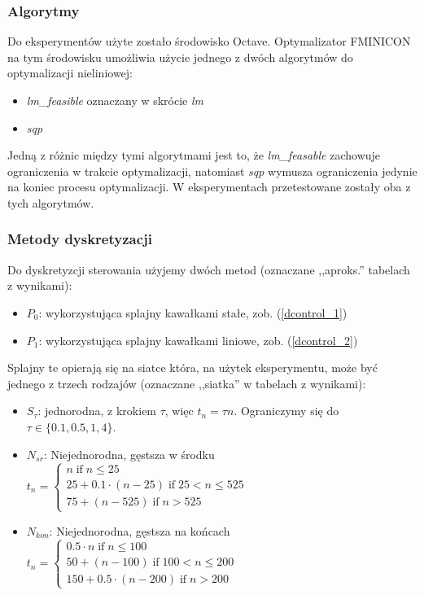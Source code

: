 \documentclass[11pt]{article}
\def\iif{\operatorname{if}}
\begin{document}
\subsubsection{Algorytmy}
Do eksperymentów użyte zostało środowisko Octave. Optymalizator FMINICON na tym środowisku umożliwia użycie jednego z dwóch algorytmów do optymalizacji nieliniowej:
\begin{itemize}
\item{\it lm\_feasible\/} oznaczany w skrócie {\it lm\/}
\item{\it sqp\/}
\end{itemize}
Jedną z różnic między tymi algorytmami jest to, że {\it lm\_feasable\/} zachowuje ograniczenia w trakcie optymalizacji, natomiast {\it sqp\/} wymusza ograniczenia jedynie na koniec procesu optymalizacji. W eksperymentach przetestowane zostały oba z tych algorytmów.
\subsubsection{Metody dyskretyzacji}
Do dyskretyzcji sterowania użyjemy dwóch metod (oznaczane ,,aproks.'' tabelach z wynikami):
\begin{itemize}
\item{$P_0$:} wykorzystująca splajny kawałkami stałe, zob. (\ref{dcontrol_1})
\item{$P_1$:} wykorzystująca splajny kawałkami liniowe, zob. (\ref{dcontrol_2})
\end{itemize}
Splajny te opierają się na siatce która, na użytek eksperymentu, może być jednego z trzech rodzajów (oznaczane ,,siatka'' w tabelach z wynikami):
\begin{itemize}
\item{$S_{\tau}$:} jednorodna, z krokiem $\tau$, więc $t_n = \tau n$. Ograniczymy się do $\tau \in \{0.1, 0.5, 1, 4\}$.
\item{$N_{sr}$: Niejednorodna, gęstsza w środku} $t_n = \begin{cases}
    n \iif n \le 25 \\
    25 + 0.1\cdot(n-25) \iif 25 < n \le 525 \\
    75 + (n - 525) \iif n > 525
  \end{cases}$
\item{$N_{kon}$: Niejednorodna, gęstsza na końcach} $t_n = \begin{cases}
    0.5\cdot n \iif n \le 100 \\
    50 + (n - 100) \iif 100 < n \le 200 \\
    150 + 0.5\cdot (n - 200) \iif n > 200
  \end{cases}$
\end{itemize}
\end{document}
